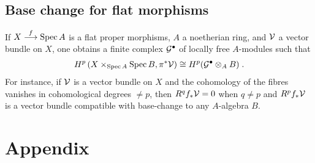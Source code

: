 \documentclass[a4paper,parskip=half,numbers=enddot, DIV=12]{scrreprt}
\begin{document}
\section{Base change for flat morphisms}
If $X\morphism[f]\Spec A$ is a flat proper morphisms, $A$ a noetherian ring, and $\mathcal{V}$ a vector bundle on $X$, one obtains a finite complex $\mathcal{G}^\bullet$ of locally free $A$-modules such that 
\begin{align*}
	H^p\left(X\times_{\operatorname{Spec} A}\operatorname{Spec} B,\pi^*\mathcal{V}\right)\cong H^p(\mathcal{G}^\bullet\otimes_AB)\;.
\end{align*}
For instance, if $\mathcal{V}$ is a vector bundle on $X$ and the cohomology of the fibres vanishes in cohomological degrees $\neq p$, then $R^qf_*\mathcal{V}=0$ when $q\neq p$ and $R^pf_*\mathcal{V}$ is a vector bundle compatible with base-change to any $A$-algebra $B$.


\Appendix
\chapter{Appendix}
\end{document}

